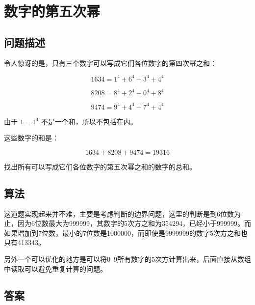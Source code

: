 \section{数字的第五次幂}
\subsection{问题描述}
\begin{tcolorbox}

令人惊讶的是，只有三个数字可以写成它们各位数字的第四次幂之和：

\[
1634 = 1^4 + 6^4 + 3^4 + 4^4
\]

\[
8208 = 8^4 + 2^4 + 0^4 + 8^4
\]

\[
9474 = 9^4 + 4^4 + 7^4 + 4^4
\]

由于 $1 = 1^4$ 不是一个和，所以不包括在内。

这些数字的和是：

\[
1634 + 8208 + 9474 = 19316
\]

找出所有可以写成它们各位数字的第五次幂之和的数字的总和。
\end{tcolorbox}

\subsection{算法}
这道题实现起来并不难，主要是考虑判断的边界问题，这里的判断是到6位数为止，因为6位数最大为\num{999999}，其数字的5次方之和为\num{354294}，已经小于\num{999999}。而如果增加到7位数，最小的7位数是\num{1000000}，而即使是\num{9999999}的数字5次方之和也只有\num{413343}。

另外一个可以优化的地方是可以将0--9所有数字的5次方计算出来，后面直接从数组中读取可以避免重复计算的问题。

\subsection{答案}
